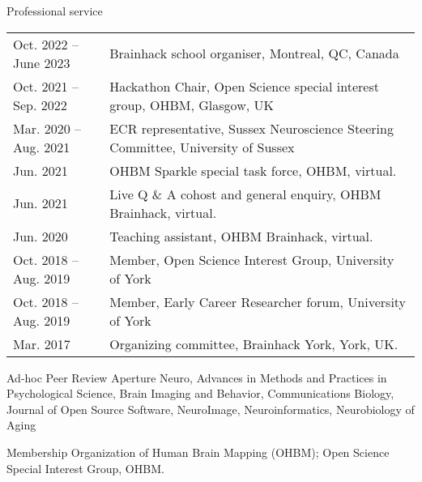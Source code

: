\documentclass{resume} %
\begin{document}
\begin{rSection}{Professional service}
\begin{tabular}{@{} l l @{\hspace{6ex}}}
  Oct. 2022 -- June 2023 & Brainhack school organiser, Montreal, QC, Canada \\
  Oct. 2021 -- Sep. 2022 & Hackathon Chair, Open Science special interest group, OHBM, Glasgow, UK \\
  Mar. 2020 -- Aug. 2021 & ECR representative, Sussex Neuroscience Steering Committee, University of Sussex\\
  Jun. 2021 & OHBM Sparkle special task force, OHBM, virtual. \\
  Jun. 2021 & Live Q \& A cohost and general enquiry, OHBM Brainhack, virtual. \\
  Jun. 2020 & Teaching assistant, OHBM Brainhack, virtual. \\
  Oct. 2018 -- Aug. 2019 & Member, Open Science Interest Group, University of York\\
  Oct. 2018 -- Aug. 2019 & Member, Early Career Researcher forum, University of York\\
  Mar. 2017 & Organizing committee, Brainhack York, York, UK.\\
\end{tabular}
\end{rSection}

\begin{rSection}{Ad-hoc Peer Review}
Aperture Neuro,
Advances in Methods and Practices in Psychological Science,
Brain Imaging and Behavior,
Communications Biology,
Journal of Open Source Software,
NeuroImage,
Neuroinformatics,
Neurobiology of Aging
\end{rSection}

\begin{rSection}{Membership}
Organization of Human Brain Mapping (OHBM); Open Science Special Interest Group, OHBM.
\end{rSection}
\end{document}
